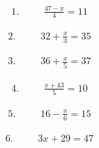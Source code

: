 \documentclass{article}
\begin{document}
\begin{minipage}[t]{0.5\textwidth}
	\begin{align*}
		1.\hspace{30pt}\frac{47-x}{4}=11
	\end{align*}
\end{minipage}
\begin{minipage}[t]{0.5\textwidth}
	\begin{align*}
		2.\hspace{30pt}32+\frac{x}{3}=35
	\end{align*}
\end{minipage}

\vspace{10 mm}

\begin{minipage}[t]{0.5\textwidth}
	\begin{align*}
		3.\hspace{30pt}36+\frac{x}{5}=37
	\end{align*}
\end{minipage}
\begin{minipage}[t]{0.5\textwidth}
	\begin{align*}
		4.\hspace{30pt}\frac{x+43}{5}=10
	\end{align*}
\end{minipage}

\vspace{10 mm}

\begin{minipage}[t]{0.5\textwidth}
	\begin{align*}
		5.\hspace{30pt}16-\frac{x}{6}=15
	\end{align*}
\end{minipage}
\begin{minipage}[t]{0.5\textwidth}
	\begin{align*}
		6.\hspace{30pt}3x+29=47
	\end{align*}
\end{minipage}

\vspace{10 mm}
\end{document}
